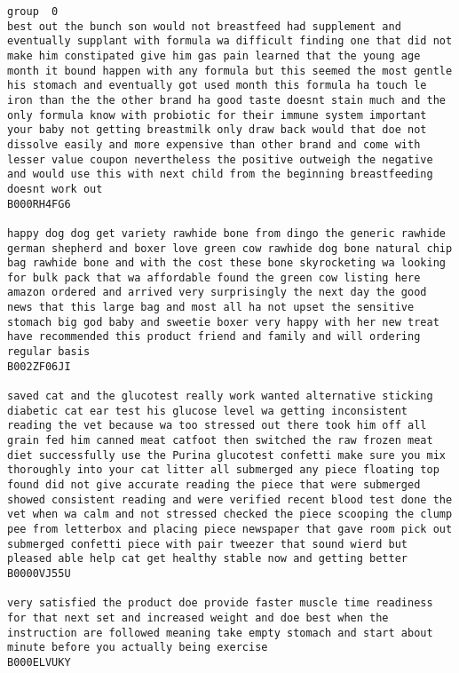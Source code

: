 \documentclass[11pt]{article}
\begin{document}
    \begin{Verbatim}[commandchars=\\\{\}]
group  0
best out the bunch son would not breastfeed had supplement and eventually supplant with formula wa difficult finding one that did not make him constipated give him gas pain learned that the young age month it bound happen with any formula but this seemed the most gentle his stomach and eventually got used month this formula ha touch le iron than the the other brand ha good taste doesnt stain much and the only formula know with probiotic for their immune system important your baby not getting breastmilk only draw back would that doe not dissolve easily and more expensive than other brand and come with lesser value coupon nevertheless the positive outweigh the negative and would use this with next child from the beginning breastfeeding doesnt work out
B000RH4FG6

happy dog dog get variety rawhide bone from dingo the generic rawhide german shepherd and boxer love green cow rawhide dog bone natural chip bag rawhide bone and with the cost these bone skyrocketing wa looking for bulk pack that wa affordable found the green cow listing here amazon ordered and arrived very surprisingly the next day the good news that this large bag and most all ha not upset the sensitive stomach big god baby and sweetie boxer very happy with her new treat have recommended this product friend and family and will ordering regular basis
B002ZF06JI

saved cat and the glucotest really work wanted alternative sticking diabetic cat ear test his glucose level wa getting inconsistent reading the vet because wa too stressed out there took him off all grain fed him canned meat catfoot then switched the raw frozen meat diet successfully use the Purina glucotest confetti make sure you mix thoroughly into your cat litter all submerged any piece floating top found did not give accurate reading the piece that were submerged showed consistent reading and were verified recent blood test done the vet when wa calm and not stressed checked the piece scooping the clump pee from letterbox and placing piece newspaper that gave room pick out submerged confetti piece with pair tweezer that sound wierd but pleased able help cat get healthy stable now and getting better
B0000VJ55U

very satisfied the product doe provide faster muscle time readiness for that next set and increased weight and doe best when the instruction are followed meaning take empty stomach and start about minute before you actually being exercise
B000ELVUKY


\end{Verbatim}
\end{document}
